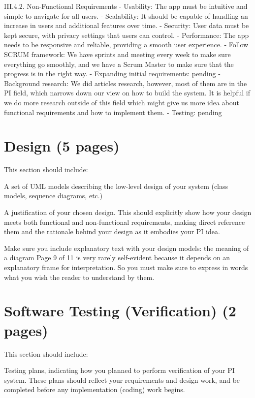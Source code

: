 \documentclass[12pt]{article}
\begin{document}
III.4.2. Non-Functional Requirements
-    Usability: The app must be intuitive and simple to navigate for all users.
-    Scalability: It should be capable of handling an increase in users and additional features over time.
-    Security: User data must be kept secure, with privacy settings that users can control.
-    Performance: The app needs to be responsive and reliable, providing a smooth user experience.
-    Follow SCRUM framework: We have sprints and meeting every week to make sure everything go smoothly, and we have a Scrum Master to make sure that the progress is in the right way.
-    Expanding initial requirements: pending
-    Background research: We did articles research, however, most of them are in the PI field, which narrows down our view on how to build the system. It is helpful if we do more research outside of this field which might give us more idea about functional requirements and how to implement them.
-    	Testing: pending



\section{Design (5 pages)}

This section should include:

A set of UML models describing the low-level design of your system (class models,
sequence diagrams, etc.)

A justification of your chosen design. This should explicitly show how your design
meets both functional and non-functional requirements, making direct reference
them and the rationale behind your design as it embodies your PI idea.

Make sure you include explanatory text with your design models: the meaning of a diagram
Page 9 of 11
is very rarely self-evident because it depends on an explanatory frame for interpretation. So
you must make sure to express in words what you wish the reader to understand by them.


\section{Software Testing (Verification) (2 pages)}

This section should include:

Testing plans, indicating how you planned to perform verification of your PI system.
These plans should reflect your requirements and design work, and be completed
before any implementation (coding) work begins.
\end{document}
